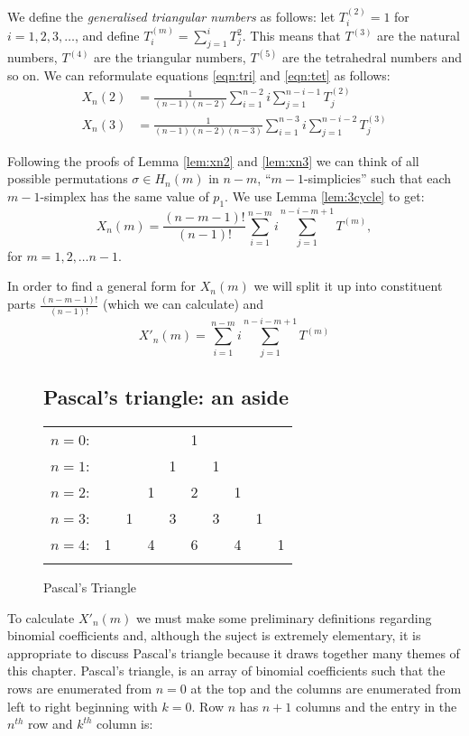 \documentclass[oneside]{book} %
\theoremstyle{definition}
\numberwithin{equation}{section}
\begin{document}
We define the \emph{generalised triangular numbers} as follows: let $T^{(2)}_i = 1$ for $i = 1,2,3,\dots$, and define $T^{(m)}_{i} = \sum_{j=1}^iT_{j}^{2}$.  This means that $T^{(3)}$ are the natural numbers, $T^{(4)}$ are the triangular numbers, $T^{(5)}$ are the tetrahedral numbers and so on.  We can reformulate equations \ref{eqn:tri} and \ref{eqn:tet} as follows:
\begin{align}
 X_n(2) &=  \frac{1}{(n-1)(n-2)}\sum_{i=1}^{n-2}i\sum_{j=1}^{n-i-1} T^{(2)}_{j} \\
 X_n(3) &=  \frac{1}{(n-1)(n-2)(n-3)}\sum_{i=1}^{n-3}i \sum_{j=1}^{n-i-2} T^{(3)}_{j} 
\end{align}

Following the proofs of Lemma \ref{lem:xn2} and \ref{lem:xn3} we can think of all possible permutations $\sigma \in H_n(m)$ in $n-m$, ``$m-1$-simplicies'' such that each $m-1$-simplex has the same value of $p_1$. We use Lemma \ref{lem:3cycle} to get:
\begin{equation}
 X_n(m) = \frac{(n-m-1)!}{(n-1)!}\sum_{i=1}^{n-m} i \sum_{j=1}^{n-i-m+1}T^{(m)},
\end{equation}
for $m = 1,2,\dots n-1$.

In order to find a general form for $X_n(m)$ we will split it up into constituent parts $\frac{(n-m-1)!}{(n-1)!}$ (which we can calculate) and 
\begin{equation}\label{eqn:xdash}
 X'_n(m) = \sum_{i=1}^{n-m} i \sum_{j=1}^{n-i-m+1}T^{(m)}
\end{equation}
\begin{figure}

\subsection{Pascal's triangle: an aside}

\begin{tabular}{rccccccccc}
$n=0$:&    &    &    &    &  1\\\noalign{\smallskip\smallskip}
$n=1$:&    &    &    &  1 &    &  1\\\noalign{\smallskip\smallskip}
$n=2$:&    &    &  1 &    &  2 &    &  1\\\noalign{\smallskip\smallskip}
$n=3$:&    &  1 &    &  3 &    &  3 &    &  1\\\noalign{\smallskip\smallskip}
$n=4$:&  1 &    &  4 &    &  6 &    &  4 &    &  1\\\noalign{\smallskip\smallskip}
\end{tabular}
\caption{Pascal's Triangle}\label{fig:pt}
\end{figure}
To calculate $X'_n(m)$ we must make some preliminary definitions regarding binomial coefficients and, although the suject is 
extremely elementary, it is appropriate to discuss Pascal's triangle because it draws together many themes of this chapter.  
Pascal's triangle, is an array of binomial coefficients such that the rows are enumerated from $n=0$ at the top and the columns 
are enumerated from left to right beginning with $k=0$.  Row $n$ has $n+1$ columns and the entry in the $n^{th}$ row and $k^{th}$
column is:
\end{document}
